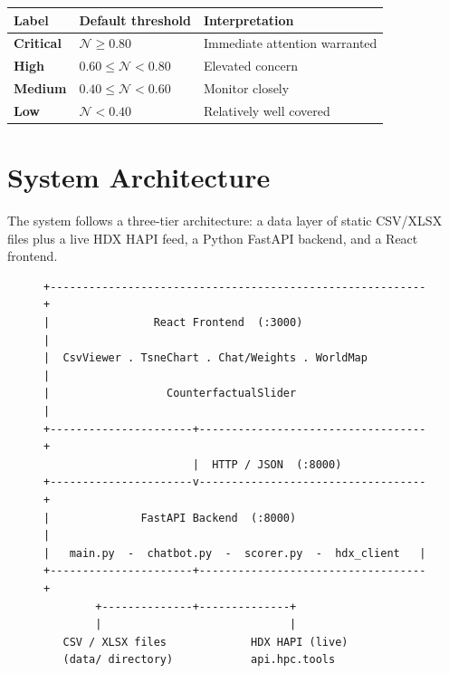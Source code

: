 \documentclass[11pt,a4paper]{article}
\begin{document}
\begin{center}
  \begin{tabular}{lll}
    \toprule
    Label                                       & Default threshold              & Interpretation                \\
    \midrule
    \textcolor{critical-red}{\textbf{Critical}} & $\mathcal{N} \geq 0.80$        & Immediate attention warranted \\
    \textcolor{high-orange}{\textbf{High}}      & $0.60 \leq \mathcal{N} < 0.80$ & Elevated concern              \\
    \textbf{Medium}                             & $0.40 \leq \mathcal{N} < 0.60$ & Monitor closely               \\
    \textbf{Low}                                & $\mathcal{N} < 0.40$           & Relatively well covered       \\
    \bottomrule
  \end{tabular}
\end{center}

\section{System Architecture}

The system follows a three-tier architecture: a data layer of static CSV/XLSX files
plus a live HDX HAPI feed, a Python FastAPI backend, and a React frontend.

\begin{figure}[h]
  \centering
  \begin{minipage}{0.9\textwidth}
    \begin{lstlisting}[language={},numbers=none,frame=single,
  caption={High-level architecture overview}]
+----------------------------------------------------------+
|                React Frontend  (:3000)                   |
|  CsvViewer . TsneChart . Chat/Weights . WorldMap         |
|                  CounterfactualSlider                    |
+----------------------+-----------------------------------+
                       |  HTTP / JSON  (:8000)
+----------------------v-----------------------------------+
|              FastAPI Backend  (:8000)                    |
|   main.py  -  chatbot.py  -  scorer.py  -  hdx_client   |
+----------------------+-----------------------------------+
        +--------------+--------------+
        |                             |
   CSV / XLSX files             HDX HAPI (live)
   (data/ directory)            api.hpc.tools
\end{lstlisting}
  \end{minipage}
\end{figure}
\end{document}
